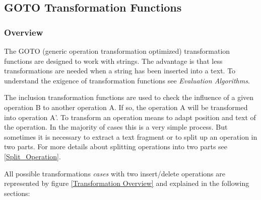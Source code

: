 \newpage
\subsection{GOTO Transformation Functions}

\subsubsection{Overview}
The GOTO (generic operation transformation optimized) transformation functions are designed to work with strings. The advantage is that less transformations are needed when a string has been inserted into a text. To understand the exigence of transformation functions see \emph{Evaluation Algorithms}.

The inclusion transformation functions are used to check the influence of a given operation B to another operation A. If so, the operation A will be transformed into operation A'. To transform an operation means to adapt position and text of the operation. In the majority of cases this is a very simple process. But sometimes it is necessary to extract a text fragment or to split up an operation in two parts. For more details about splitting operations into two parts see \ref{Split_Operation}.

All possible transformations \emph{cases} with two insert/delete operations are represented by figure \ref{Transformation Overview} and explained in the following sections:

